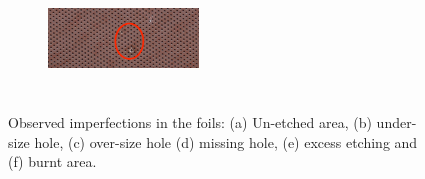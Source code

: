 \begin{figure}[!htbp]
\begin{subfigure}[b]{0.29\textwidth}
        \caption{ }
        \label{fig:O_5b}
    \end{subfigure}
    \centering
    \begin{subfigure}[b]{0.29\textwidth}
        \includegraphics[width=4cm, height=3cm]{figures/GEM/figures/3f.jpg}
        \caption{ }
        \label{fig:O_5c}
    \end{subfigure}
   \caption{Observed imperfections in the foils: (a) Un-etched area, (b) under-size hole, (c) over-size hole (d) missing hole, (e) excess etching and (f) burnt area.} \label{fig:Optical_01}
\end{figure}


